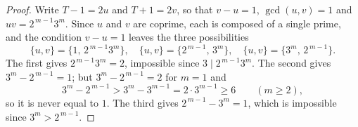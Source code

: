 \documentclass[10pt,a4paper]{amsart}
\begin{document}
\begin{proof}
Write $T-1=2u$ and $T+1=2v$, so that $v-u=1$, $\gcd(u,v)=1$ and
$uv=2^{\,m-1}3^{m}$. Since $u$ and $v$ are coprime, each is composed of a
single prime, and the condition $v-u=1$ leaves the three possibilities
\[
\{u,v\}=\bigl\{1,\,2^{\,m-1}3^{m}\bigr\},\quad
\{u,v\}=\bigl\{2^{\,m-1},\,3^{m}\bigr\},\quad
\{u,v\}=\bigl\{3^{m},\,2^{\,m-1}\bigr\}.
\]
The first gives $2^{\,m-1}3^{m}=2$, impossible since $3\mid 2^{\,m-1}3^{m}$.
The second gives $3^{m}-2^{\,m-1}=1$; but $3^{m}-2^{\,m-1}=2$ for $m=1$ and
\[
3^{m}-2^{\,m-1}>3^{m}-3^{m-1}=2\cdot 3^{m-1}\geq 6 \qquad(m\geq 2),
\]
so it is never equal to $1$. The third gives $2^{\,m-1}-3^{m}=1$, which is
impossible since $3^{m}>2^{\,m-1}$.
\end{proof}
\end{document}
